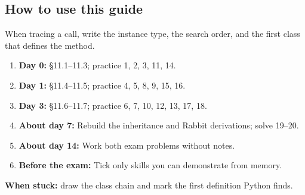 \documentclass[11pt]{article}
\begin{document}
\begin{keepsection}
\section{How to use this guide}

When tracing a call, write the instance type, the search order, and the first class that defines the method.

\begin{enumerate}
\item \textbf{Day 0:} §11.1–11.3; practice 1, 2, 3, 11, 14.
\item \textbf{Day 1:} §11.4–11.5; practice 4, 5, 8, 9, 15, 16.
\item \textbf{Day 3:} §11.6–11.7; practice 6, 7, 10, 12, 13, 17, 18.
\item \textbf{About day 7:} Rebuild the inheritance and Rabbit derivations; solve 19–20.
\item \textbf{About day 14:} Work both exam problems without notes.
\item \textbf{Before the exam:} Tick only skills you can demonstrate from memory.
\end{enumerate}

\begin{notebox}\textbf{When stuck:} draw the class chain and mark the first definition Python finds.\end{notebox}
\end{keepsection}
\end{document}
